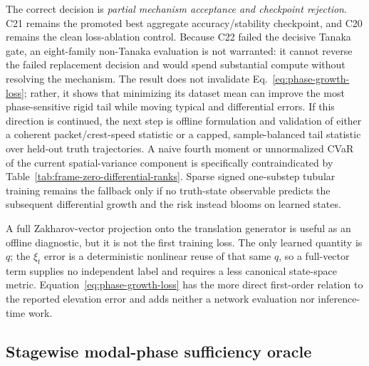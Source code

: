 \documentclass[11pt]{article}
\begin{document}
The correct decision is \emph{partial mechanism acceptance and checkpoint
rejection}.  C21 remains the promoted best aggregate accuracy/stability
checkpoint, and C20 remains the clean loss-ablation control.  Because C22
failed the decisive Tanaka gate, an eight-family non-Tanaka evaluation is not
warranted: it cannot reverse the failed replacement decision and would spend
substantial compute without resolving the mechanism.  The result does not
invalidate Eq.~\eqref{eq:phase-growth-loss}; rather, it shows that minimizing
its dataset mean can improve the most phase-sensitive rigid tail while moving
typical and differential errors.  If this direction is continued, the next
step is offline formulation and validation of either a coherent
packet/crest-speed statistic or a capped, sample-balanced tail statistic over
held-out truth trajectories.  A naive fourth moment or unnormalized CVaR of the
current spatial-variance component is specifically contraindicated by
Table~\ref{tab:frame-zero-differential-ranks}.  Sparse signed one-substep tubular
training remains the fallback only if no truth-state observable predicts the
subsequent differential growth and the risk instead blooms on learned states.

A full Zakharov-vector projection onto the translation generator is useful as
an offline diagnostic, but it is not the first training loss.  The only learned
quantity is \(q\); the \(\xi_t\) error is a deterministic nonlinear reuse of
that same \(q\), so a full-vector term supplies no independent label and
requires a less canonical state-space metric.  Equation~\eqref{eq:phase-growth-loss}
has the more direct first-order relation to the reported elevation error and
adds neither a network evaluation nor inference-time work.

\subsection{Stagewise modal-phase sufficiency oracle}
\label{sec:modal-phase-oracle}
\end{document}

